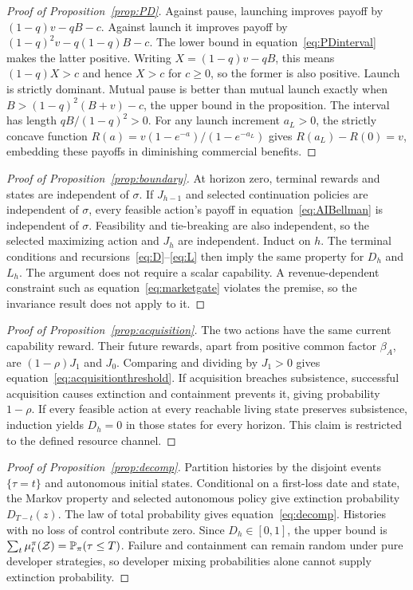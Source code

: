 \begin{proof}[Proof of Proposition~\ref{prop:PD}]
Against pause, launching improves payoff by $(1-q)v-qB-c$. Against launch it improves payoff by $(1-q)^2v-q(1-q)B-c$. The lower bound in equation~\eqref{eq:PDinterval} makes the latter positive. Writing $X=(1-q)v-qB$, this means $(1-q)X>c$ and hence $X>c$ for $c\geq0$, so the former is also positive. Launch is strictly dominant. Mutual pause is better than mutual launch exactly when $B>(1-q)^2(B+v)-c$, the upper bound in the proposition. The interval has length $qB/(1-q)^2>0$. For any launch increment $a_L>0$, the strictly concave function $R(a)=v(1-e^{-a})/(1-e^{-a_L})$ gives $R(a_L)-R(0)=v$, embedding these payoffs in diminishing commercial benefits.
\end{proof}

\begin{proof}[Proof of Proposition~\ref{prop:boundary}]
At horizon zero, terminal rewards and states are independent of $\sigma$. If $J_{h-1}$ and selected continuation policies are independent of $\sigma$, every feasible action's payoff in equation~\eqref{eq:AIBellman} is independent of $\sigma$. Feasibility and tie-breaking are also independent, so the selected maximizing action and $J_h$ are independent. Induct on $h$. The terminal conditions and recursions~\eqref{eq:D}--\eqref{eq:L} then imply the same property for $D_h$ and $L_h$. The argument does not require a scalar capability. A revenue-dependent constraint such as equation~\eqref{eq:marketgate} violates the premise, so the invariance result does not apply to it.
\end{proof}

\begin{proof}[Proof of Proposition~\ref{prop:acquisition}]
The two actions have the same current capability reward. Their future rewards, apart from positive common factor $\beta_A$, are $(1-\rho)J_1$ and $J_0$. Comparing and dividing by $J_1>0$ gives equation~\eqref{eq:acquisitionthreshold}. If acquisition breaches subsistence, successful acquisition causes extinction and containment prevents it, giving probability $1-\rho$. If every feasible action at every reachable living state preserves subsistence, induction yields $D_h=0$ in those states for every horizon. This claim is restricted to the defined resource channel.
\end{proof}

\begin{proof}[Proof of Proposition~\ref{prop:decomp}]
Partition histories by the disjoint events $\{\tau=t\}$ and autonomous initial states. Conditional on a first-loss date and state, the Markov property and selected autonomous policy give extinction probability $D_{T-t}(z)$. The law of total probability gives equation~\eqref{eq:decomp}. Histories with no loss of control contribute zero. Since $D_h\in[0,1]$, the upper bound is $\sum_t\mu^\pi_t(\mathcal Z)=\mathbb P_\pi(\tau\leq T)$. Failure and containment can remain random under pure developer strategies, so developer mixing probabilities alone cannot supply extinction probability.
\end{proof}

